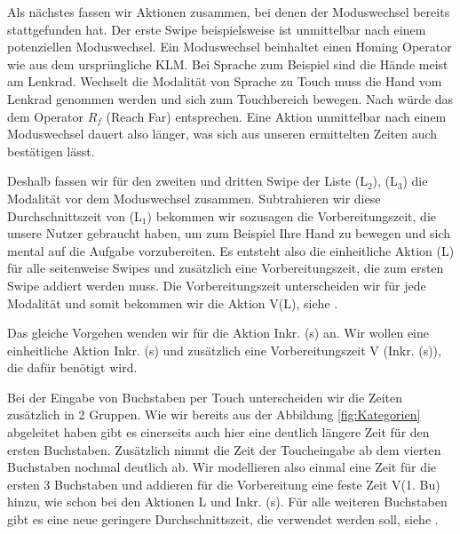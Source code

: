Als nächstes fassen wir Aktionen zusammen, bei denen der Moduswechsel bereits stattgefunden hat. 
Der erste Swipe beispielsweise ist unmittelbar nach einem potenziellen Moduswechsel. 
Ein Moduswechsel beinhaltet einen Homing Operator wie aus dem ursprüngliche KLM. 
Bei Sprache zum Beispiel sind die Hände meist am Lenkrad. 
Wechselt die Modalität von Sprache zu Touch muss die Hand vom Lenkrad genommen werden und sich zum Touchbereich bewegen. 
Nach \citet{Green_2002} würde das dem Operator $R_f$ (Reach Far) entsprechen. 
Eine Aktion unmittelbar nach einem Moduswechsel dauert also länger, was sich aus unseren ermittelten Zeiten auch bestätigen lässt. 

Deshalb fassen wir für den zweiten und dritten Swipe der Liste (L$_2$), (L$_3$) die Modalität vor dem Moduswechsel zusammen. Subtrahieren wir diese Durchschnittszeit von (L$_1$) bekommen wir sozusagen die Vorbereitungszeit, die unsere Nutzer gebraucht haben, um zum Beispiel Ihre Hand zu bewegen und sich mental auf die Aufgabe vorzubereiten. Es entsteht also die einheitliche Aktion (L) für alle seitenweise Swipes und zusätzlich eine Vorbereitungszeit, die zum ersten Swipe addiert werden muss. Die Vorbereitungszeit unterscheiden wir für jede Modalität und somit bekommen wir die Aktion V(L), siehe .
 
Das gleiche Vorgehen wenden wir für die Aktion Inkr. (s) an. Wir wollen eine einheitliche Aktion Inkr. (s) und zusätzlich eine Vorbereitungszeit V (Inkr. (s)), die dafür benötigt wird. 
 
Bei der Eingabe von Buchstaben per Touch unterscheiden wir die Zeiten zusätzlich in 2 Gruppen. Wie wir bereits aus der Abbildung \ref{fig:Kategorien} abgeleitet haben gibt es einerseits auch hier eine deutlich längere Zeit für den ersten Buchstaben. 
Zusätzlich nimmt die Zeit der Toucheingabe ab dem vierten Buchstaben nochmal deutlich ab. 
Wir modellieren also einmal eine Zeit für die ersten 3 Buchstaben und addieren für die Vorbereitung eine feste Zeit V(1. Bu) hinzu, wie schon bei den Aktionen L und Inkr. (s). 
Für alle weiteren Buchstaben gibt es eine neue geringere Durchschnittszeit, die verwendet werden soll, siehe .  

